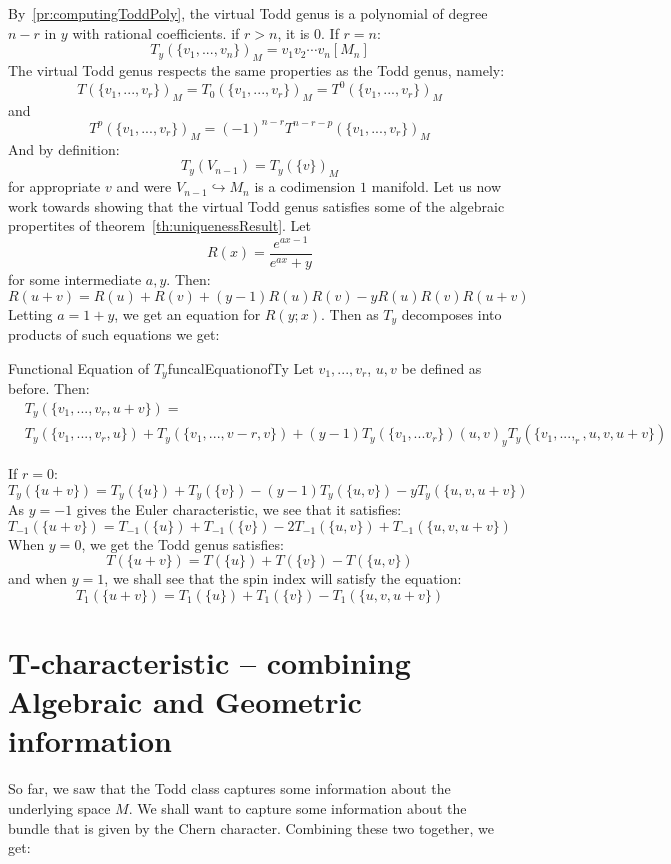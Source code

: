 \documentclass{book}
\begin{document}
By~\cref{pr:computingToddPoly}, the virtual Todd genus is a polynomial of degree $n-r$ in $y$ with rational
coefficients. if $r > n$, it is $0$. If $r = n$:
\[
  T_y(\{v_1, ..., v_n\})_M = v_1v_2\cdots v_n[M_n]
\]
The virtual Todd genus respects the same properties as the Todd genus, namely:
\[
  T(\{v_1, ..., v_r\})_M = T_0(\{v_1, ..., v_r\})_M = T^0(\{v_1, ..., v_r\})_M
\]
and
\[
  T^p(\{v_1, ..., v_r\})_M = (-1)^{n-r} T^{n-r-p}(\{v_1, ..., v_r\})_M
\]
And by definition:
\[
  T_y(V_{n-1}) = T_y(\{v\})_M
\]
for appropriate $v$ and were $V_{n-1} \hookrightarrow M_n$ is a codimension $1$ manifold. Let us now work
towards showing that the virtual Todd genus satisfies some of the algebraic propertites of
theorem~\cref{th:uniquenessResult}. Let
\[
R(x) = \frac{e^{ax-1}}{e^{ax}+y}
\]
for some intermediate $a,y$. Then:
\[
  R(u+v) = R(u) + R(v) + (y-1)R(u)R(v) - yR(u)R(v)R(u+v)
\]
Letting $a = 1+y$, we get an equation for $R(y;x)$. Then as $T_y$ decomposes into products of such equations
we get:

\begin{thm}{Functional Equation of $T_y$}{funcalEquationofTy}
  Let $v_1, ..., v_r$, $u,v$ be defined as before. Then:
  \begin{align*}
    &T_y(\{v_1, ..., v_r, u+v\}) =\\
    &T_y(\{v_1, ..., v_r, u\}) + T_y(\{v_1, ..., v-r, v\}) + (y-1)T_y(\{v_1,. .. v_r\})(u,v)
    _ yT_y(\{v_1, ..., _r, u,v,u+v\})
  \end{align*}
\end{thm}

If $r = 0$:
\[
  T_y(\{u+v\})  =T_y(\{u\}) + T_y(\{v\}) - (y-1)T_y(\{u,v\}) - yT_y(\{u,v,u+v\})
\]
As $y=-1$ gives the Euler characteristic, we see that it satisfies:
\[
  T_{-1}(\{u+v\}) = T_{-1}(\{u\}) + T_{-1}(\{v\}) - 2T_{-1}(\{u,v\}) + T_{-1}(\{u,v,u+v\})
\]
When $y  =0$, we get the Todd genus satisfies:
\[
  T(\{u+v\})  =T(\{u\}) + T(\{v\}) - T(\{u,v\})
\]
and when $y=1$, we shall see that the spin index will satisfy the equation:
\[
  T_1(\{u+v\}) = T_1(\{u\}) + T_1(\{v\}) - T_1(\{u,v,u+v\})
\]

\section{T-characteristic -- combining Algebraic and Geometric information}\label{sec:T-Char}

So far, we saw that the Todd class captures some information about the underlying space $M$. We shall want
to capture some information about the bundle that is given by the Chern character. Combining these
two together, we get:
\end{document}

